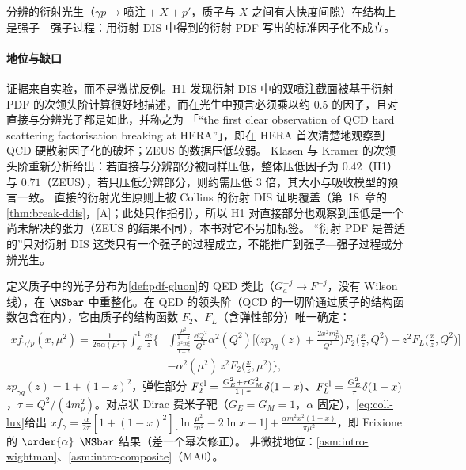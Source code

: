 \begin{proposition}\label{prop:coll-diffractive-photo}
分辨的衍射光生（$\gamma p\to\text{喷注}+X+p'$，质子与 $X$ 之间有大快度间隙）在结构上是强子—强子过程：用衍射 DIS 中得到的衍射 PDF 写出的标准因子化不成立。
\end{proposition}

\paragraph{地位与缺口}
证据来自实验，而不是微扰反例。H1 发现衍射 DIS 中的双喷注截面被基于衍射 PDF 的次领头阶计算很好地描述，而在光生中预言必须乘以约 $0.5$ 的因子，且对直接与分辨光子都是如此，并称之为
「“the first clear observation of QCD hard scattering factorisation breaking at HERA”」\cite{H1:2007jtx}，即在 HERA 首次清楚地观察到 QCD 硬散射因子化的破坏；ZEUS 的数据压低较弱\cite{ZEUS:2007uvk}。
Klasen 与 Kramer 的次领头阶重新分析给出：若直接与分辨部分被同样压低，整体压低因子为 $0.42$（H1）与 $0.71$（ZEUS），若只压低分辨部分，则约需压低 $3$ 倍，其大小与吸收模型的预言一致\cite{Klasen:2008ah}。
直接的衍射光生原则上被 Collins 的衍射 DIS 证明覆盖（第~18~章的\cref{thm:break-ddis}，[A]；此处只作指引），所以 H1 对直接部分也观察到压低是一个尚未解决的张力（ZEUS 的结果不同），本书对它不另加标签。
“衍射 PDF 是普适的”只对衍射 DIS 这类只有一个强子的过程成立，不能推广到强子—强子过程或分辨光生。

\begin{proposition}\label{prop:coll-luxqed}
定义质子中的光子分布为\cref{def:pdf-gluon}的 QED 类比（$G^{+j}_a\to F^{+j}$，没有 Wilson 线），在 $\MSbar$ 中重整化。在 QED 的领头阶（QCD 的一切阶通过质子的结构函数包含在内），它由质子的结构函数 $F_2$、$F_L$（含弹性部分）唯一确定：
\begin{equation}\label{eq:coll-lux}
\begin{aligned}
xf_{\gamma/p}(x,\mu^2)=\frac1{2\pi\alpha(\mu^2)}\int_x^1\frac{\dd z}z\Big\{&\int_{\frac{x^2m_p^2}{1-z}}^{\frac{\mu^2}{1-z}}\frac{\dd Q^2}{Q^2}\alpha^2(Q^2)\Big[\Big(zp_{\gamma q}(z)+\frac{2x^2m_p^2}{Q^2}\Big)F_2\Big(\frac xz,Q^2\Big)-z^2F_L\Big(\frac xz,Q^2\Big)\Big]\\
&-\alpha^2(\mu^2)\,z^2F_2\Big(\frac xz,\mu^2\Big)\Big\},
\end{aligned}
\end{equation}
$zp_{\gamma q}(z)=1+(1-z)^2$，弹性部分 $F_2^{\rm el}=\frac{G_E^2+\tau G_M^2}{1+\tau}\delta(1-x)$、$F_L^{\rm el}=\frac{G_E^2}\tau\delta(1-x)$，$\tau=Q^2/(4m_p^2)$。对点状 Dirac 费米子靶（$G_E=G_M=1$，$\alpha$ 固定），\cref{eq:coll-lux}给出
$xf_\gamma=\frac\alpha{2\pi}[1+(1-x)^2]\big[\ln\frac{\mu^2}{m^2}-2\ln x-1\big]+\frac{\alpha m^2x^2(1-x)}{\pi\mu^2}$，即 Frixione 的 $\order{\alpha}$ $\MSbar$ 结果\cite[式~(4.189)]{Frixione:2019lga}（差一个幂次修正）。
非微扰地位：\cref{asm:intro-wightman}、\cref{asm:intro-composite}（MA0）。
\end{proposition}

